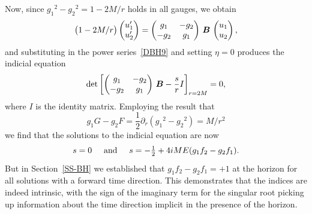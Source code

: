 \documentclass[a4paper]{article}
\numberwithin{equation}{section}
\newcommand{\hs}[1]{\hspace*{#1cm}}
\newcommand{\half}{{\textstyle \frac{1}{2}}}
\newcommand{\bB}{\mbox{\boldmath $B$}}
\newcommand{\dr}{\partial_r}
\begin{document}
%
Now, since ${g_1}^2-{g_2}^2 = 1-2M/r$ holds in all gauges, we obtain
%
\begin{equation}
\bigl(1-2M/r \bigr)
\begin{pmatrix} u_1' \\ u_2' \end{pmatrix} 
= 
\begin{pmatrix} g_1 & -g_2 \\ -g_2 & g_1 \end{pmatrix} 
\, \bB \, 
\begin{pmatrix} u_1 \\ u_2 \end{pmatrix},
\end{equation}
%
and substituting in the power series~\eqref{DBH9} and setting $\eta=0$
produces the indicial equation
%
\begin{equation}
\det \left[ \begin{pmatrix} g_1 & -g_2 \\ -g_2 & g_1 \end{pmatrix} \,
\bB - \frac {s}{r} I \right]_{r=2M} = 0,
\end{equation}
%
where $I$ is the identity matrix.  Employing the result that
%
\begin{equation}
g_1G - g_2 F = \half \dr ({g_1}^2-{g_2}^2) = M/r^2
\end{equation}
%
we find that the solutions to the indicial equation are now
%
\begin{equation}
s=0 \hs{0.5} \mbox{and} \hs{0.5} s = -\half + 4iME (g_1 f_2-g_2 f_1).
\end{equation}
%
But in Section~\ref{SS-BH} we established that $g_1 f_2-g_2 f_1=+1$ at
the horizon for all solutions with a forward time direction.  This
demonstrates that the indices are indeed intrinsic, with the sign of
the imaginary term for the singular root picking up information about
the time direction implicit in the presence of the horizon.
\end{document}
